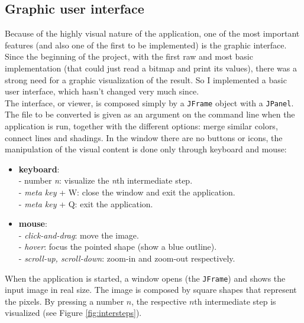 \documentclass[]{usiinfbachelorproject}
\begin{document}

\subsection{Graphic user interface} \label{sec:gui}

Because of the highly visual nature of the application, one of the most important features (and also one of the first to be implemented) is the graphic interface.\\
Since the beginning of the project, with the first raw and most basic implementation (that could just read a bitmap and print its values), there was a strong need for a graphic visualization of the result. So I implemented a basic user interface, which hasn't changed very much since.\\
The interface, or viewer, is composed simply by a {\tt JFrame} object with a {\tt JPanel}. The file to be converted is given as an argument on the command line when the application is run, together with the different options: merge similar colors, connect lines and shadings. In the window there are no buttons or icons, the manipulation of the visual content is done only through keyboard and mouse:
\begin{itemize}
	\item {\bf keyboard}: \\
	- number \emph{n}: visualize the \emph{n}th intermediate step.\\
	- \emph{meta key} + W: close the window and exit the application.\\
	- \emph{meta key} + Q: exit the application.

	\item {\bf mouse}:\\
	- \emph{click-and-drag}: move the image.\\
	- \emph{hover}: focus the pointed shape (show a blue outline).\\
	- \emph{scroll-up, scroll-down}: zoom-in and zoom-out respectively.
\end{itemize}
When the application is started, a window opens (the {\tt JFrame}) and shows the input image in real size. The image is composed by square shapes that represent the pixels. By pressing a number $n$, the respective $n$th intermediate step is visualized (see Figure \ref{fig:intersteps}).\\
\end{document}
